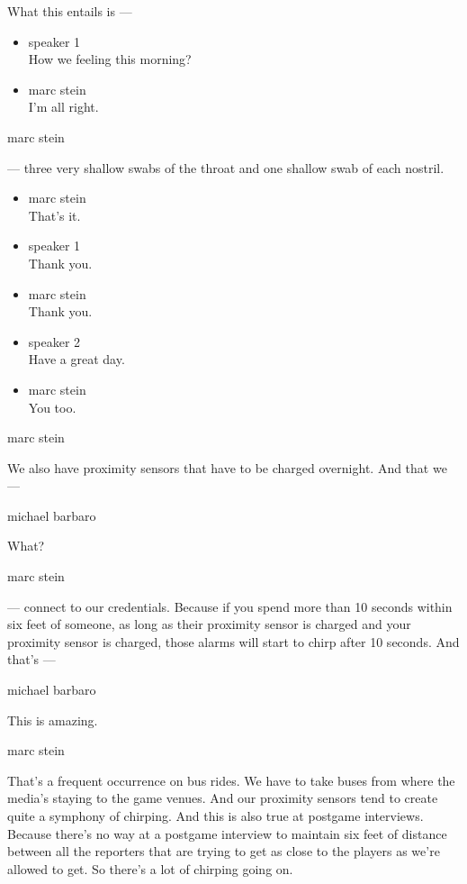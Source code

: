 What this entails is ---

\begin{itemize}
\item
  speaker 1\\
  How we feeling this morning?
\item
  marc stein\\
  I'm all right.
\end{itemize}

marc stein

--- three very shallow swabs of the throat and one shallow swab of each
nostril.

\begin{itemize}
\item
  marc stein\\
  That's it.
\item
  speaker 1\\
  Thank you.
\item
  marc stein\\
  Thank you.
\item
  speaker 2\\
  Have a great day.
\item
  marc stein\\
  You too.
\end{itemize}

marc stein

We also have proximity sensors that have to be charged overnight. And
that we ---

michael barbaro

What?

marc stein

--- connect to our credentials. Because if you spend more than 10
seconds within six feet of someone, as long as their proximity sensor is
charged and your proximity sensor is charged, those alarms will start to
chirp after 10 seconds. And that's ---

michael barbaro

This is amazing.

marc stein

That's a frequent occurrence on bus rides. We have to take buses from
where the media's staying to the game venues. And our proximity sensors
tend to create quite a symphony of chirping. And this is also true at
postgame interviews. Because there's no way at a postgame interview to
maintain six feet of distance between all the reporters that are trying
to get as close to the players as we're allowed to get. So there's a lot
of chirping going on.

